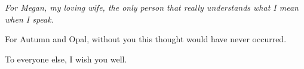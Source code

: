 \cleardoublepage
\thispagestyle{empty}
\null\vfill
\begin{center}
  \begin{minipage}{0.72\textwidth}
    \centering
    \itshape
    For Megan, my loving wife, the only person that really understands what I mean
    when I speak.

    \vspace{1.6em}

    For Autumn and Opal, without you this thought would have never occurred.

    \vspace{1.6em}

    To everyone else, I wish you well.
  \end{minipage}
\end{center}
\vfill\vfill
\cleardoublepage
